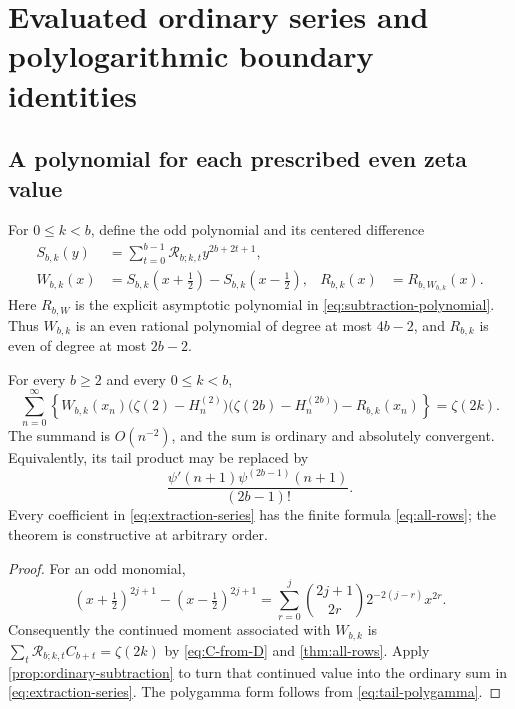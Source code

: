 \section{Evaluated ordinary series and polylogarithmic boundary identities}
\label{sec:filters}

\subsection{A polynomial for each prescribed even zeta value}

For $0\leq k<b$, define the odd polynomial and its centered difference
\begin{align}
 S_{b,k}(y)&=\sum_{t=0}^{b-1}\mathcal R_{b;k,t}y^{2b+2t+1},
 \label{eq:S-filter}\\
 W_{b,k}(x)&=S_{b,k}(x+\tfrac12)-S_{b,k}(x-\tfrac12),
 &R_{b,k}(x)&=R_{b,W_{b,k}}(x).
 \label{eq:W-filter}
\end{align}
Here $R_{b,W}$ is the explicit asymptotic polynomial in
\eqref{eq:subtraction-polynomial}. Thus $W_{b,k}$ is an even rational
polynomial of degree at most $4b-2$, and $R_{b,k}$ is even of degree
at most $2b-2$.

\begin{theorem}
\label{thm:extraction-series}
For every $b\geq2$ and every $0\leq k<b$,
\begin{equation}\label{eq:extraction-series}
 \boxed{\displaystyle
 \sum_{n=0}^{\infty}
  \left\{W_{b,k}(x_n)
    \bigl(\zeta(2)-H_n^{(2)}\bigr)
    \bigl(\zeta(2b)-H_n^{(2b)}\bigr)-R_{b,k}(x_n)\right\}
 =\zeta(2k).}
\end{equation}
The summand is $O(n^{-2})$, and the sum is ordinary and absolutely
convergent. Equivalently, its tail product may be replaced by
\begin{equation}\label{eq:extraction-polygamma}
 \frac{\psi'(n+1)\psi^{(2b-1)}(n+1)}{(2b-1)!}.
\end{equation}
Every coefficient in \eqref{eq:extraction-series} has the finite formula
\eqref{eq:all-rows}; the theorem is constructive at arbitrary order.
\end{theorem}
\begin{proof}
For an odd monomial,
\[
 (x+\tfrac12)^{2j+1}-(x-\tfrac12)^{2j+1}
 =\sum_{r=0}^j\binom{2j+1}{2r}2^{-2(j-r)}x^{2r}.
\]
Consequently the continued moment associated with $W_{b,k}$ is
$\sum_t\mathcal R_{b;k,t}C_{b+t}=\zeta(2k)$ by
\eqref{eq:C-from-D} and \cref{thm:all-rows}. Apply
\cref{prop:ordinary-subtraction} to turn that continued value into
the ordinary sum in \eqref{eq:extraction-series}. The polygamma
form follows from \eqref{eq:tail-polygamma}.
\end{proof}

